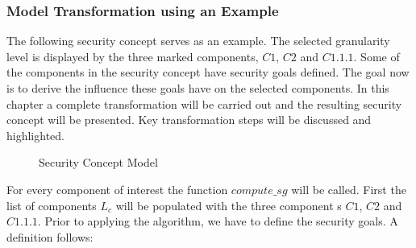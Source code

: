 \subsubsection{Model Transformation using an Example}

The following security concept serves as an example. The selected granularity level is displayed by the three marked components, $C1$, $C2$ and $C1.1.1$. Some of the components in the security concept have security goals defined. The goal now is to derive the influence these goals have on the selected components. In this chapter a complete transformation will be carried out and the resulting security concept will be presented. Key transformation steps will be discussed and highlighted.

\begin{figure}[H]
    \vspace*{-2cm}
    \caption{Security Concept Model}
\end{figure}

For every component of interest the function $compute\_sg$ will be called. First the list of components $L_c$ will be populated with the three component s $C1$, $C2$ and $C1.1.1$. Prior to applying the algorithm, we have to define the security goals. A definition follows:

